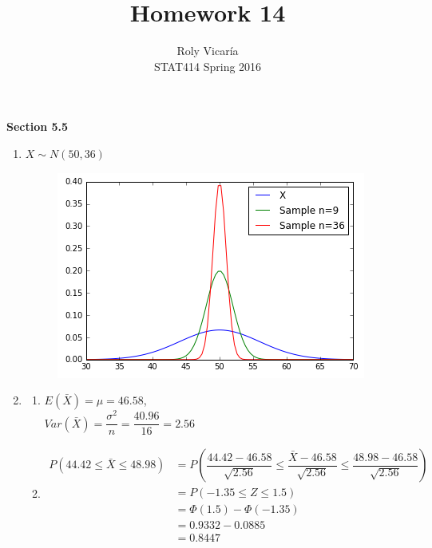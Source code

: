 \documentclass{article}
\title{Homework 14}
\author{Roly Vicar\'ia \\ STAT414 Spring 2016}
\newcommand\myskip[1]{\addtocounter{enumi}{#1}}
\begin{document}
    
    \maketitle
    
    \textbf{Section 5.5}
    \begin{enumerate}
      \myskip{1}
      
      \item
	$X \sim N(50,36)$
	\begin{figure}[h!]
	  \centering
	  \includegraphics[scale=.8]{./images/2_plotSampleDistributions.png}
	\end{figure}
      
      \item
	\begin{enumerate}
	 \item 
	  $E(\bar{X}) = \mu = 46.58$, \\
	  $Var(\bar{X}) = \dfrac{\sigma^2}{n} = \dfrac{40.96}{16} = 2.56$
	  
	 \item
	  \begin{align*}
	   P(44.42 \le \bar{X} \le 48.98) &= 
	    P\left(\dfrac{44.42 - 46.58}{\sqrt{2.56}} \le \dfrac{\bar{X} - 46.58}{\sqrt{2.56}} \le 
	      \dfrac{48.98 - 46.58}{\sqrt{2.56}}\right) \\
	    &= P(-1.35 \le Z \le 1.5) \\
	    &= \Phi(1.5) - \Phi(-1.35) \\
	    &= 0.9332 - 0.0885 \\
	    &= 0.8447
	  \end{align*}
	\end{enumerate}
      \myskip{1}
      

\end{enumerate}
\end{document}
